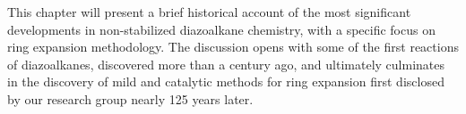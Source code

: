 This chapter will present a brief historical
account of the most significant developments in non-stabilized diazoalkane chemistry, with a
specific focus on ring expansion methodology. The discussion opens with some of the first reactions of diazoalkanes, discovered more than a century ago, and ultimately culminates in the discovery of
mild and catalytic methods for ring expansion first disclosed by our research group nearly 125 years
later.





